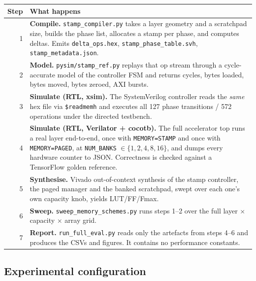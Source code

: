 \documentclass[11pt,a4paper]{article}
\newcommand{\file}[1]{\texttt{\small #1}}
\begin{document}
\begin{center}
\small
\begin{tabular}{@{}rp{13.5cm}@{}}
\toprule
\textbf{Step} & \textbf{What happens} \\
\midrule
1 & \textbf{Compile.} \file{stamp\_compiler.py} takes a layer geometry and a
    scratchpad size, builds the phase list, allocates a stamp per phase, and
    computes deltas. Emits \file{delta\_ops.hex}, \file{stamp\_phase\_table.svh},
    \file{stamp\_metadata.json}. \\
2 & \textbf{Model.} \file{pysim/stamp\_ref.py} replays that op stream through a
    cycle-accurate model of the controller FSM and returns cycles, bytes loaded,
    bytes moved, bytes zeroed, AXI bursts. \\
3 & \textbf{Simulate (RTL, xsim).} The SystemVerilog controller reads the
    \emph{same} hex file via \file{\$readmemh} and executes all 127 phase
    transitions / 572 operations under the directed testbench. \\
4 & \textbf{Simulate (RTL, Verilator + cocotb).} The full accelerator top runs a
    real layer end-to-end, once with \file{MEMORY=STAMP} and once with
    \file{MEMORY=PAGED}, at \file{NUM\_BANKS} $\in \{1,2,4,8,16\}$, and dumps
    every hardware counter to JSON. Correctness is checked against a
    TensorFlow golden reference. \\
5 & \textbf{Synthesise.} Vivado out-of-context synthesis of the stamp
    controller, the paged manager and the banked scratchpad, swept over each
    one's own capacity knob, yields LUT/FF/Fmax. \\
6 & \textbf{Sweep.} \file{sweep\_memory\_schemes.py} runs steps 1--2 over the
    full layer $\times$ capacity $\times$ array grid. \\
7 & \textbf{Report.} \file{run\_full\_eval.py} reads only the artefacts from
    steps 4--6 and produces the CSVs and figures. It contains no performance
    constants. \\
\bottomrule
\end{tabular}
\end{center}

\subsection{Experimental configuration}
\end{document}
